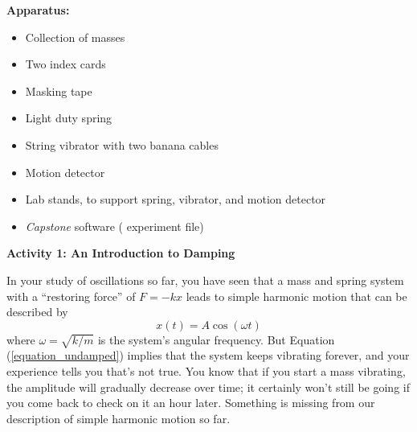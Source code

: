 \makelabheader %

\bigskip
\textbf{Apparatus:}
\begin{itemize}[nosep]
\item Collection of masses 
\item Two index cards
\item Masking tape
\item Light duty spring
\item String vibrator with two banana cables
\item Motion detector
\item Lab stands, to support spring, vibrator, and motion detector
\item \textit{Capstone} software ( experiment file)
\end{itemize}


\bigskip
\textbf{Activity 1: An Introduction to Damping} 

In your study of oscillations so far, you have seen that a mass and spring system with a ``restoring force'' of $F=-kx$ leads to simple harmonic motion that can be described by
\begin{equation}
x(t)=A\cos (\omega t)
\label{equation_undamped}
\end{equation}
where $\omega = \sqrt{k/m}$ is the system's angular frequency.
But Equation (\ref{equation_undamped}) implies that the system keeps vibrating forever, and your experience tells you that's not true.  You know that if you start a mass vibrating, the amplitude will gradually decrease over time; it certainly won't still be going if you come back to check on it an hour later.  Something is missing from our description of simple harmonic motion so far.


